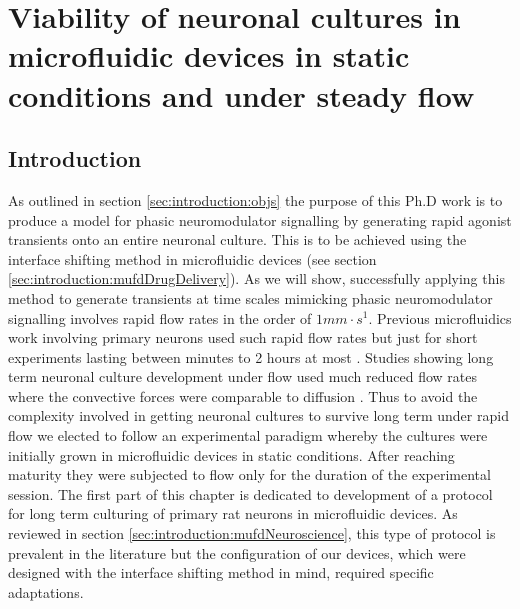 \chapter{Viability of neuronal cultures in microfluidic devices in static conditions and under steady flow}
\label{chap:devicesAndFlow}


\section{Introduction}
\label{sec:devices:introduction}
As outlined in section \ref{sec:introduction:objs} the purpose of this Ph.D work is to produce a model for phasic neuromodulator signalling by generating rapid agonist transients onto an entire neuronal culture. This is to be achieved using the interface shifting method in microfluidic devices (see section \ref{sec:introduction:mufdDrugDelivery}). As we will show, successfully applying this method to generate transients at time scales mimicking phasic neuromodulator signalling involves rapid flow rates in the order of \(1 mm\cdot s^{1}\). Previous microfluidics work involving primary neurons used such rapid flow rates but just for short experiments lasting between minutes to 2 hours at most \cite{biffi2012microfluidic,morel2012amplification,wang2008microfluidics,pearce2005integrated}. Studies showing long term neuronal culture development under flow used much reduced flow rates where the convective forces were comparable to diffusion \cite{choi2013neurotoxic,millet2007microfluidic,park2015three,kumamoto2015effects}. Thus to avoid the complexity involved in getting neuronal cultures to survive long term under rapid flow we elected to follow an experimental paradigm whereby the cultures were initially grown in microfluidic devices in static conditions. After reaching maturity they were subjected to flow only for the duration of the experimental session. The first part of this chapter is dedicated to development of a protocol for long term culturing of primary rat neurons in microfluidic devices. As reviewed in section \ref{sec:introduction:mufdNeuroscience}, this type of protocol is prevalent in the literature but the configuration of our devices, which were designed with the interface shifting method in mind, required specific adaptations.

